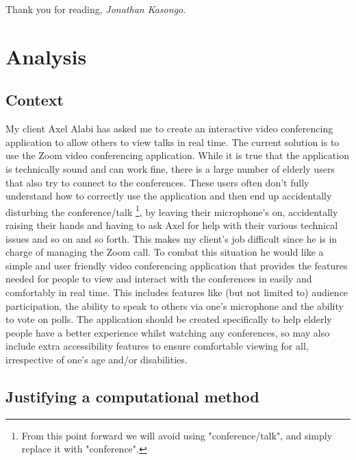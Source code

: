Thank you for reading, \textit{Jonathan Kasongo}.

\chapter{Analysis}

\section{Context}
\label{sec:context}

My client Axel Alabi has asked me to create an interactive
video conferencing application to allow others to view talks 
in real time. The current solution is to use the Zoom 
video conferencing application. While it is true that the 
application is technically sound and can work fine, there is a
large number of elderly users that also try to connect to the 
conferences. These users often don't fully understand how to 
correctly use the application and then end up accidentally 
disturbing the conference/talk \footnote{From this point 
forward we will avoid using "conference/talk", and simply
replace it with "conference".}, by leaving their microphone's
on, accidentally raising their hands and having to ask Axel
for help with their various technical issues and so on and so
forth. This makes my client's job difficult since he is in 
charge of managing the Zoom call. To combat this situation 
he would like a simple and user friendly video conferencing 
application that provides the features needed for people to 
view and interact with the conferences in easily and
comfortably in real time. This includes 
features like (but not limited to) audience participation,
the ability to speak to others via one's microphone and the
ability to vote on polls. The application should be
created specifically to help elderly people have a better 
experience whilst watching any conferences, so may also
include extra accessibility features to ensure comfortable
viewing for all, irrespective of one's age and/or disabilities.

\section{Justifying a computational method}
\label{sec:computational}


